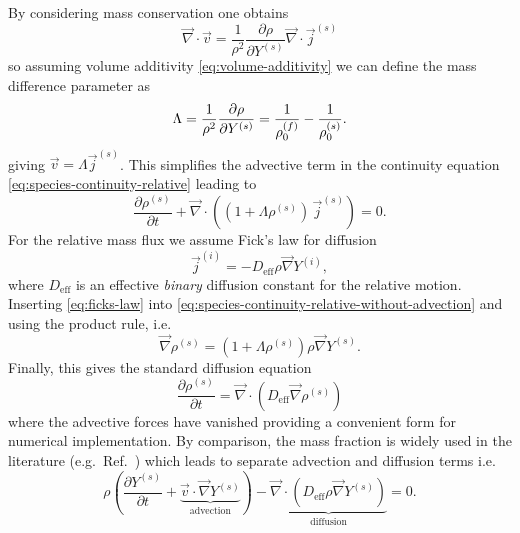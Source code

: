 \documentclass[11pt,twoside]{report}
\begin{document}
By considering mass conservation one obtains
\begin{equation*}
  \vec{\nabla} \cdot \vec{v}
  =
  \frac{1}{\rho^2}
  \frac{\partial \rho}{\partial Y^{(s)}}
  \vec{\nabla} \cdot \vec{j}^{(s)}
\end{equation*}
so assuming volume additivity \eqref{eq:volume-additivity} we can define the mass difference parameter as
\begin{equation}\label{eq:lambda}
  \Lambda
  =
  \frac{1}{\rho^2} \frac{\partial \rho}{\partial Y^{(s)}} \\
  =
  \frac{1}{\rho^{(f)}_0} -
  \frac{1}{\rho^{(s)}_0}.
\end{equation}
giving $\vec{v} = \Lambda \vec{j}^{(s)}$.
This simplifies the advective term in the continuity equation \eqref{eq:species-continuity-relative} leading to
\begin{equation}\label{eq:species-continuity-relative-without-advection}
  \frac{\partial \rho^{(s)}}{\partial t} +
  \vec{\nabla} \cdot \left(
  (1 + \Lambda \rho^{(s)}) \, \vec{j}^{(s)}
  \right) = 0.
\end{equation}
For the relative mass flux we assume Fick's law for diffusion
\begin{equation}\label{eq:ficks-law}
  \vec{j}^{(i)} = -D_\mathrm{eff} \rho \vec{\nabla} Y^{(i)},
\end{equation}
where $D_\mathrm{eff}$ is an effective \emph{binary} diffusion constant for the relative motion.
Inserting \eqref{eq:ficks-law} into \eqref{eq:species-continuity-relative-without-advection} and using the product rule, i.e.\
\begin{equation*}
  \vec{\nabla} \rho^{(s)}
  =
  \left(
  1 +
  \Lambda \rho^{(s)}
  \right)
  \rho
  \vec{\nabla} Y^{(s)}.
\end{equation*}
Finally, this gives the standard diffusion equation
\begin{equation}\label{eq:final-diffusion}
  \frac{\partial \rho^{(s)}}{\partial t}
  =
  \vec{\nabla} \cdot \left(
  D_\mathrm{eff} \vec{\nabla} \rho^{(s)}
  \right)
\end{equation}
where the advective forces have vanished providing a convenient form for numerical implementation.
By comparison, the mass fraction is widely used in the literature (e.g.\ Ref.\ \cite{HandscombCES2009}) which leads to separate advection and diffusion terms i.e.\
\begin{equation*}
  \rho \left(
  \frac{\partial Y^{(s)}}{\partial t} +
  \underbrace{\vec{v} \cdot \vec{\nabla} Y^{(s)}}_\textrm{advection}
  \right)
  -
  \underbrace{\vec{\nabla} \cdot (D_{\textrm{eff}} \rho \vec{\nabla} Y^{(s)})}_\textrm{diffusion}
  = 0.
\end{equation*}
\end{document}
